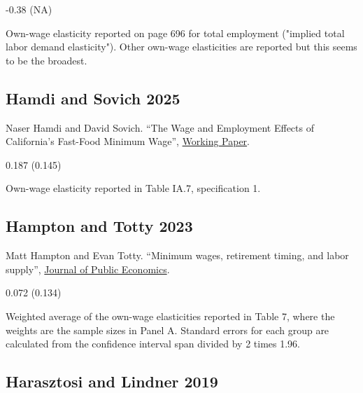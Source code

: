  -0.38 (NA)

\vspace{0.7em}

 Own-wage elasticity reported on page 696 for total employment ("implied total labor demand elasticity"). Other own-wage elasticities are reported but this seems to be the broadest.

\subsection*{Hamdi and Sovich 2025}
\vspace{-0.7em}

\noindent Naser Hamdi and David Sovich. ``The Wage and Employment Effects of California's Fast-Food Minimum Wage'', \href{https://papers.ssrn.com/sol3/papers.cfm?abstract_id=5197571}{Working Paper}.

\vspace{0.7em}

 0.187 (0.145)

\vspace{0.7em}

 Own-wage elasticity reported in Table IA.7, specification 1.

\subsection*{Hampton and Totty 2023}
\vspace{-0.7em}

\noindent Matt Hampton and Evan Totty. ``Minimum wages, retirement timing, and labor supply'', \href{https://doi.org/10.1016/j.jpubeco.2023.104924}{Journal of Public Economics}.

\vspace{0.7em}

 0.072 (0.134)

\vspace{0.7em}

 Weighted average of the own-wage elasticities reported in Table 7, where the weights are the sample sizes in Panel A. Standard errors for each group are calculated from the confidence interval span divided by 2 times 1.96.

\subsection*{Harasztosi and Lindner 2019}
\vspace{-0.7em}

